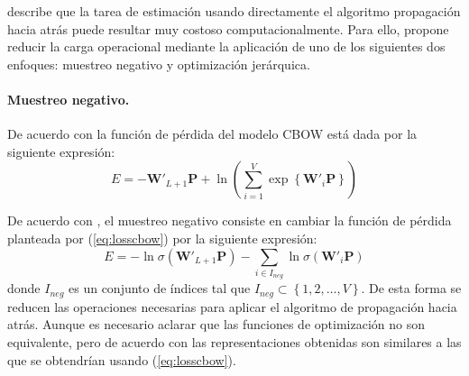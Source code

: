 \cite{mikolov2013efficient} describe que la tarea de estimación usando directamente el algoritmo propagación hacia atrás puede resultar muy costoso computacionalmente. Para ello, propone reducir la carga operacional mediante la aplicación de uno de los siguientes dos enfoques: muestreo negativo y optimización jerárquica.

\paragraph{Muestreo negativo.} De acuerdo con \cite{rong2014word2vec} la función de pérdida del modelo CBOW está dada por la siguiente expresión:
\begin{equation}
	\label{eq:losscbow}
	E = - \mathbf{W}'_{L+1}\mathbf{P} + \ln \left(\sum_{i=1}^{V} \exp\left\lbrace \mathbf{W}'_{i}\mathbf{P}\right\rbrace\right)
\end{equation}

De acuerdo con \cite{goldberg2014word2vec}, el muestreo negativo consiste en cambiar la función de pérdida planteada por (\ref{eq:losscbow}) por la siguiente expresión:
\begin{equation}
	\label{eq:losscbow2}
	E = - \ln \sigma\left(\mathbf{W}'_{L+1}\mathbf{P}\right) - \sum_{i \in I_{neg}} \ln \sigma\left(\mathbf{W}'_{i}\mathbf{P}\right)
\end{equation}
donde $I_{neg}$ es un conjunto de índices tal que $I_{neg} \subset \left\lbrace1,2,\ldots,V\right\rbrace$. De esta forma se reducen las operaciones necesarias para aplicar el algoritmo de propagación hacia atrás. Aunque es necesario aclarar que las funciones de optimización no son equivalente, pero de acuerdo con \cite{goldberg2014word2vec} las representaciones obtenidas son similares a las que se obtendrían usando (\ref{eq:losscbow}).

